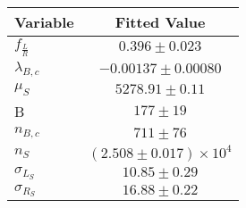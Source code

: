 \begin{tabular}[t]{lc}
\hline
Variable &Fitted Value\\
\hline\hline
$f_{\frac{L}{R}}$&$0.396\pm0.023$\\
\hline
$\lambda_{B,c}$&$-0.00137\pm0.00080$\\
\hline
$\mu_S$&$5278.91\pm0.11$\\
\hline
B&$177\pm19$\\
\hline
$n_{B,c}$&$711\pm76$\\
\hline
$n_S$&$(2.508\pm0.017)\times 10^4$\\
\hline
$\sigma_{L_S}$&$10.85\pm0.29$\\
\hline
$\sigma_{R_S}$&$16.88\pm0.22$\\
\hline
\end{tabular}